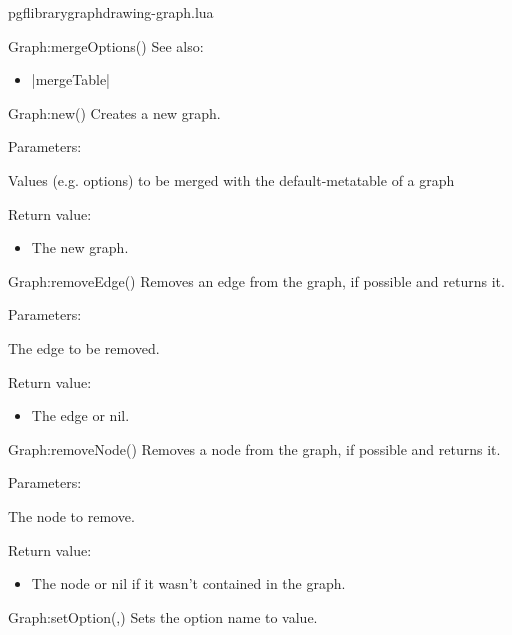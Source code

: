 \begin{filedescription}{pgflibrarygraphdrawing-graph.lua}
\begin{luacommand}{{Graph:mergeOptions}()}
See also:
\begin{itemize}
	\item[] |mergeTable|
\end{itemize}

\end{luacommand}\begin{luacommand}{{Graph:new}()}
Creates a new graph.

Parameters:
\begin{parameterdescription}
	\item[\meta{values}] Values (e.g. options) to be merged with the default-metatable of a graph
\end{parameterdescription}


Return value:
\begin{itemize} \item[] The new graph. \end{itemize}


\end{luacommand}\begin{luacommand}{{Graph:removeEdge}()}
Removes an edge from the graph, if possible and returns it.

Parameters:
\begin{parameterdescription}
	\item[\meta{edge}] The edge to be removed.
\end{parameterdescription}


Return value:
\begin{itemize} \item[] The edge or nil. \end{itemize}


\end{luacommand}\begin{luacommand}{{Graph:removeNode}()}
Removes a node from the graph, if possible and returns it.

Parameters:
\begin{parameterdescription}
	\item[\meta{node}] The node to remove.
\end{parameterdescription}


Return value:
\begin{itemize} \item[] The node or nil if it wasn't contained in the graph. \end{itemize}


\end{luacommand}\begin{luacommand}{{Graph:setOption}(,)}
Sets the option name to value.


\end{luacommand}
\end{filedescription}
